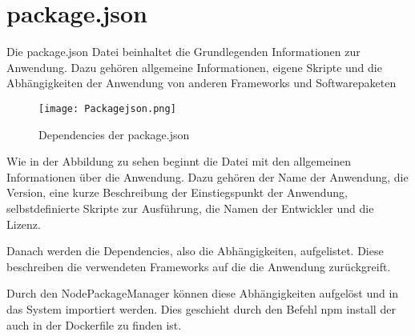 
\chapter{package.json}
\label{ch:package.json}
Die package.json Datei beinhaltet die Grundlegenden Informationen zur Anwendung. Dazu gehören allgemeine Informationen, eigene Skripte und die Abhängigkeiten der Anwendung von anderen Frameworks und Softwarepaketen

\begin{wrapfigure}{r}{0\textwidth}
\centering
\texttt{[image: Packagejson.png]}
\vspace{4pt}
\caption{Dependencies der package.json}
\label{fig:Dependencies der package.json}
\end{wrapfigure}

Wie in der Abbildung zu sehen beginnt die Datei mit den allgemeinen Informationen über die Anwendung. Dazu gehören der Name der Anwendung, die Version, eine kurze Beschreibung der Einstiegspunkt der Anwendung, selbstdefinierte Skripte zur Ausführung, die Namen der Entwickler und die Lizenz.

Danach werden die Dependencies, also die Abhängigkeiten, aufgelistet. Diese beschreiben die verwendeten Frameworks auf die die Anwendung zurückgreift.

Durch den \glqq NodePackageManager\grqq{} können diese Abhängigkeiten aufgelöst und in das System importiert werden. Dies geschieht durch den Befehl npm install der auch in der Dockerfile zu finden ist.